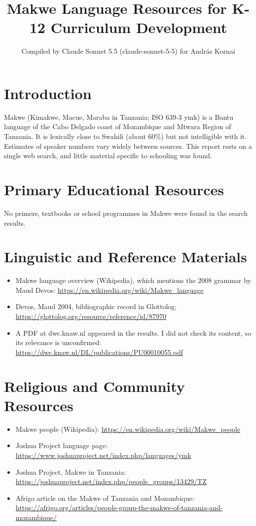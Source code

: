 \documentclass[12pt]{article}
\title{Makwe Language Resources for K-12 Curriculum Development}
\author{Compiled by Claude Sonnet 5.5 (claude-sonnet-5-5) for Andr\'as Kornai}
\date{}
\begin{document}
\maketitle

\section{Introduction}
Makwe (Kimakwe, Macue, Maraba in Tanzania; ISO 639-3 ymk) is a Bantu language of the Cabo Delgado coast of Mozambique and Mtwara Region of Tanzania. It is lexically close to Swahili (about 60\%) but not intelligible with it. Estimates of speaker numbers vary widely between sources. This report rests on a single web search, and little material specific to schooling was found.

\section{Primary Educational Resources}
No primers, textbooks or school programmes in Makwe were found in the search results.

\section{Linguistic and Reference Materials}
\begin{itemize}
\item Makwe language overview (Wikipedia), which mentions the 2008 grammar by Maud Devos: \url{https://en.wikipedia.org/wiki/Makwe_language}
\item Devos, Maud 2004, bibliographic record in Glottolog: \url{https://glottolog.org/resource/reference/id/87970}
\item A PDF at dwc.knaw.nl appeared in the results. I did not check its content, so its relevance is unconfirmed: \url{https://dwc.knaw.nl/DL/publications/PU00010055.pdf}
\end{itemize}

\section{Religious and Community Resources}
\begin{itemize}
\item Makwe people (Wikipedia): \url{https://en.wikipedia.org/wiki/Makwe_people}
\item Joshua Project language page: \url{https://www.joshuaproject.net/index.php/languages/ymk}
\item Joshua Project, Makwe in Tanzania: \url{https://joshuaproject.net/index.php/people_groups/13429/TZ}
\item Afrigo article on the Makwe of Tanzania and Mozambique: \url{https://afrigo.org/articles/people-group-the-makwe-of-tanzania-and-mozambique/}
\end{itemize}
\end{document}

